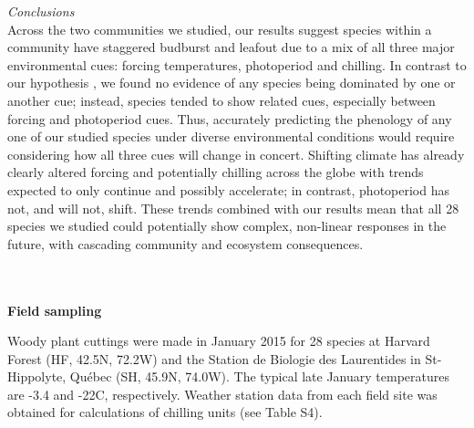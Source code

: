\documentclass[11pt]{article}
\begin{document}
\noindent \emph{Conclusions}\\
Across the two communities we studied, our results suggest species within a community have staggered budburst and leafout due to a mix of all three major environmental cues: forcing temperatures, photoperiod and chilling. In contrast to our hypothesis \citep[and others', e.g.,][]{Korner:2010}, we found no evidence of any species being dominated by one or another cue; instead, species tended to show related cues, especially between forcing and photoperiod cues.  Thus, accurately predicting the phenology of any one of our studied species under diverse environmental conditions would require considering how all three cues will change in concert. Shifting climate has already clearly altered forcing and potentially chilling across the globe \citep{ipcc2013,IPCC:2014sm} with trends expected to only continue and possibly accelerate; in contrast, photoperiod has not, and will not, shift. These trends combined with our results mean that all 28 species we studied could potentially show complex, non-linear responses in the future, with cascading community and ecosystem consequences. %



\vspace{2ex}\\
\vspace{2ex}\\
\noindent \textbf{Field sampling}

\noindent Woody plant cuttings were made in January 2015 for 28 species at Harvard Forest (HF, 42.5\degree N, 72.2\degree W) and the Station de Biologie des Laurentides in St-Hippolyte, Qu\'ebec (SH, 45.9\degree N, 74.0\degree W). The typical late January temperatures are -3.4 and -22\degree C, respectively. Weather station data from each field site was obtained for calculations of chilling units (see Table S4). %
\end{document}
